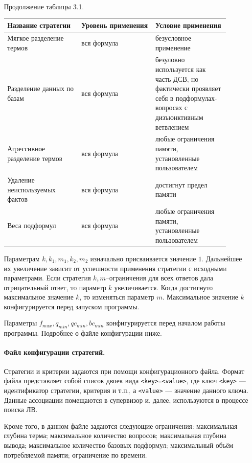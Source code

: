 \newpage
\begin{center}
Продолжение таблицы 3.1. 
\end{center}

\begin{longtable}[H]{|p{0.3\linewidth}|p{0.3\linewidth}|p{0.3\linewidth}|}
\hline
\textbf{Название стратегии} & \textbf{Уровень применения} & \textbf{Условие применения}\\
\hline
Мягкое разделение термов & вся формула & безусловное применение \\
\hline
Разделение данных по базам & вся формула & безуловно используется как часть ДСВ, но фактически проявляет себя в подформулах-вопросах с дизъюнктивным ветвлением \\
\hline
Агрессивное разделение термов & вся формула & любые ограничения памяти, установленные пользователем \\
\hline
Удаление неиспользуемых фактов & вся формула & достигнут предел памяти \\
\hline
Веса подформул & вся формула & любые ограничения памяти, установленные пользователем \\
\hline
\end{longtable}


Параметрам $k, k_1, m_1, k_2, m_2$ изначально присваивается значение $1$. Дальнейшее их увеличение зависит от успешности применения стратегии с исходными параметрами. Если стратегия $k,m$--ограничения для всех ответов дала отрицательный ответ, то параметр $k$ увеличивается. Когда достигнуто максимальное значение $k$, то изменяться параметр $m$. Максимальное значение $k$ конфигурируется перед запуском программы.

Параметры $f_{max}, q_{min}, qc_{min}, bc_{min}$ конфигурируется перед началом работы программы. Подробнее о файле конфигурации ниже.

\paragraph{Файл конфигурации стратегий.}
Стратегии и критерии задаются при помощи конфигурационного файла. Формат файла представляет собой список двоек вида \texttt{<key>=<value>}, где ключ \texttt{<key>} --- идентификатор стратегии, критерия и т.п., а \texttt{<value>} --- значение данного ключа. Данные ассоциации помещаются в супервизор и, далее, используются в процессе поиска ЛВ.

Кроме того, в данном файле задаются следующие ограничения: максимальная глубина терма; максимальное количество вопросов; максимальная глубина вывода; максимальное количество базовых подформул; максимальный объём потребляемой памяти; ограничение по времени.




